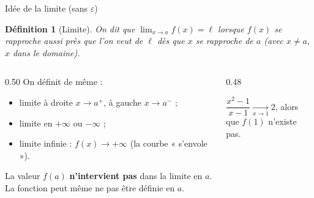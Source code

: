 \documentclass[10pt,aspectratio=169]{beamer}
\newcounter{dummy}
\numberwithin{dummy}{section}
\newtheorem{mydef}[dummy]{Définition}
\begin{document}
\begin{frame}{Idée de la limite (sans $\varepsilon$)}
\begin{mydef}[Limite]
On dit que $\displaystyle\lim_{x\to a} f(x)=\ell$ lorsque $f(x)$ se rapproche
aussi près que l'on veut de $\ell$ dès que $x$ se rapproche de $a$
(avec $x\neq a$, $x$ dans le domaine).
\end{mydef}

\vspace{0.2em}
\begin{columns}[T]
\begin{column}{0.50\textwidth}
On définit de même :
\begin{itemize}
    \item limite à droite $x\to a^+$, à gauche $x\to a^-$ ;
    \item limite en $+\infty$ ou $-\infty$ ;
    \item limite infinie : $f(x)\to+\infty$ (la courbe « s'envole »).
\end{itemize}
\vspace{0.3em}
\begin{boxattention}
La valeur $f(a)$ \textbf{n'intervient pas} dans la limite en $a$.
La fonction peut même ne pas être définie en $a$.
\end{boxattention}
\end{column}
\begin{column}{0.48\textwidth}
\centering
{}
{\scriptsize $\dfrac{x^2-1}{x-1}\xrightarrow[x\to 1]{} 2$, alors que $f(1)$ n'existe pas.}
\end{column}
\end{columns}
\end{frame}
\end{document}
